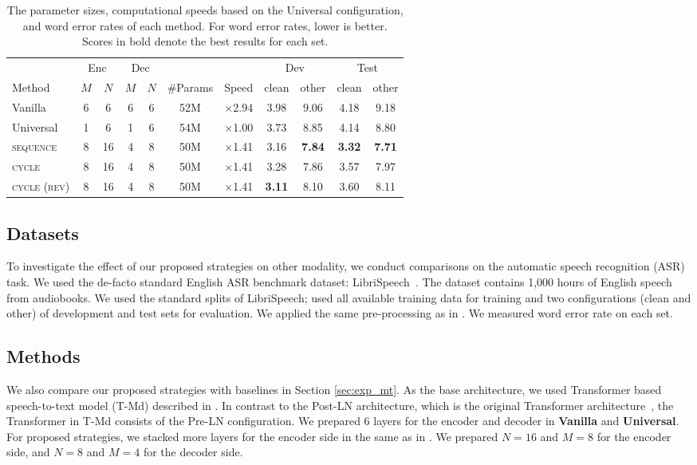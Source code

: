 \documentclass[11pt]{article}
\begin{document}
\begin{table*}[!t]
  \centering{}
\begin{tabular}{ l | c c c c | c | c | c c c c } \hline
         & \multicolumn{2}{c}{Enc} & \multicolumn{2}{c|}{Dec} & &  & \multicolumn{2}{c}{Dev} & \multicolumn{2}{c}{Test} \\
  Method & $M$ & $N$ & $M$ & $N$ & \#Params & Speed & clean & other & clean & other \\ \hline \hline
Vanilla & 6  & 6 & 6 & 6 & 52M & $\times$2.94& 3.98 & 9.06 & 4.18 & 9.18 \\
  Universal & 1 & 6 & 1 & 6 & 54M & $\times$1.00 & 3.73 & 8.85 & 4.14 & 8.80 \\ 
  \textsc{sequence} & 8 & 16 & 4 & 8 & 50M & $\times$1.41 & 3.16 & \textbf{7.84} & \textbf{3.32} & \textbf{7.71}\\
  \textsc{cycle} & 8 & 16 & 4 & 8 & 50M & $\times$1.41 & 3.28 & 7.86 & 3.57 & 7.97 \\
  \textsc{cycle (rev)} & 8 & 16 & 4 & 8 & 50M & $\times$1.41 & \textbf{3.11} & 8.10 & 3.60 & 8.11\\ \hline
  \end{tabular}
  \caption{The parameter sizes, computational speeds based on the Universal configuration, and word error rates of each method. For word error rates, lower is better. Scores in bold denote the best results for each set.\label{tab:exp_asr}}
\end{table*}

\subsection{Datasets}
To investigate the effect of our proposed strategies on other modality, we conduct comparisons on the automatic speech recognition (ASR) task.
We used the de-facto standard English ASR benchmark dataset: LibriSpeech~\cite{7178964}.
The dataset contains 1,000 hours of English speech from audiobooks.
We used the standard splits of LibriSpeech; used all available training data for training and two configurations (clean and other) of development and test sets for evaluation.
We applied the same pre-processing as in \cite{wang-etal-2020-fairseq}.
We measured word error rate on each set.

\subsection{Methods}
We also compare our proposed strategies with baselines in Section \ref{sec:exp_mt}.
As the base architecture, we used Transformer based speech-to-text model (T-Md) described in \cite{wang-etal-2020-fairseq}.
In contrast to the Post-LN architecture, which is the original Transformer architecture~\cite{NIPS2017_7181}, the Transformer in T-Md consists of the Pre-LN configuration.
We prepared 6 layers for the encoder and decoder in \textbf{Vanilla} and \textbf{Universal}.
For proposed strategies, we stacked more layers for the encoder side in the same as in \cite{wang-etal-2020-fairseq}.
We prepared $N=16$ and $M=8$ for the encoder side, and $N=8$ and $M=4$ for the decoder side.
\end{document}
